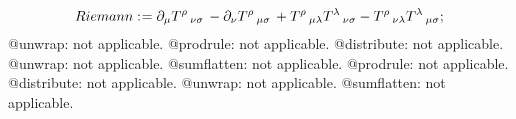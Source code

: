 \documentclass[11pt]{article}
\def\specialcolon{\mathrel{\mathop{:}}\hspace{-.5em}}
\begin{document}
\begin{dmath*}[compact, spread=2pt]
Riemann\specialcolon{}= {\partial}_{\mu}{{T}^{\rho}\,_{\nu \sigma}}\,  - {\partial}_{\nu}{{T}^{\rho}\,_{\mu \sigma}}\,  + {T}^{\rho}\,_{\mu \lambda} {T}^{\lambda}\,_{\nu \sigma} - {T}^{\rho}\,_{\nu \lambda} {T}^{\lambda}\,_{\mu \sigma};
\end{dmath*}
@unwrap: not applicable.
@prodrule: not applicable.
@distribute: not applicable.
@unwrap: not applicable.
@sumflatten: not applicable.
@prodrule: not applicable.
@distribute: not applicable.
@unwrap: not applicable.
@sumflatten: not applicable.
\end{document}
